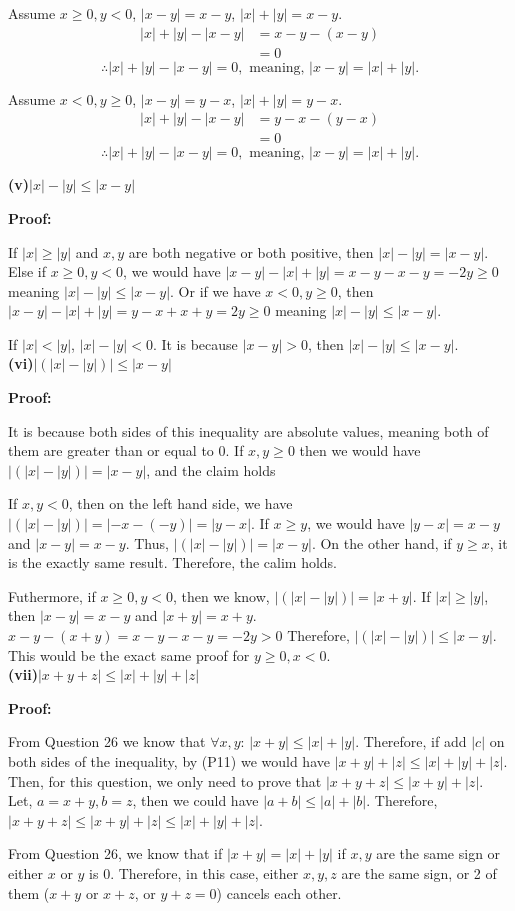 \documentclass[a4paper,12pt]{report}
\begin{document}
\noindent
Assume $x \geq 0, y < 0$, $|x-y|=x-y$, $|x|+|y| = x-y$.
\begin{align*}
 |x|+|y|-|x-y| & =x-y -(x-y) \\
 			   & =0
\end{align*}
\[\therefore |x|+|y|-|x-y|= 0, \text{ meaning, } |x-y|=|x|+|y|.\]

\noindent
Assume $x < 0, y \geq 0$, $|x-y|=y-x$, $|x|+|y| = y-x$.
\begin{align*}
 |x|+|y|-|x-y| & =y-x -(y-x) \\
 			   & =0
\end{align*}
\[\therefore |x|+|y|-|x-y|= 0, \text{ meaning, } |x-y|=|x|+|y|.\]

\noindent
\textbf{(v)}$ |x|-|y|\leq |x-y|$

\noindent
\textbf{Proof: }

\noindent
If $|x|\geq|y|$ and $x,y$ are both negative or both positive, then $ |x|-|y| = |x-y|$. Else if $x\geq 0, y <0$, we would have $|x-y|-|x|+|y|=x-y-x-y=-2y\geq 0$ meaning $ |x|-|y|\leq |x-y|$. Or if we have $x < 0, y \geq0$, then $|x-y|-|x|+|y|=y-x+x+y=2y\geq 0$ meaning $ |x|-|y|\leq |x-y|$.

\noindent
If $|x|<|y|$, $|x|-|y|<0$. It is because $|x-y|>0$, then $ |x|-|y|\leq |x-y|$. \\

\noindent
\textbf{(vi)}$ |(|x|-|y|)|\leq |x-y|$

\noindent
\textbf{Proof: }

\noindent
It is because both sides of this inequality are absolute values, meaning both of them are greater than or equal to 0. If $x,y \geq 0$ then we would have $|(|x|-|y|)|=|x-y|$, and the claim holds

\noindent
If $x,y <0$, then on the left hand side, we have $ |(|x|-|y|)|=|-x-(-y)|=|y-x|$. If $x\geq y$, we would have $|y-x|=x-y$ and $|x-y|=x-y$. Thus, $|(|x|-|y|)|=|x-y|$. On the other hand, if $y\geq x$, it is the exactly same result. Therefore, the calim holds. 

\noindent
Futhermore, if $x\geq 0, y<0$, then we know, $|(|x|-|y|)| = |x+y|$. If $|x|\geq|y|$, then $|x-y|=x-y$ and $|x+y|=x+y$. $x-y-(x+y)=x-y-x-y=-2y > 0$ Therefore, $ |(|x|-|y|)|\leq |x-y|$. This would be the exact same proof for $y\geq 0, x<0$.\\

\noindent
\textbf{(vii)}$ |x+y+z|\leq |x|+|y|+|z|$

\noindent
\textbf{Proof: }

\noindent
From Question 26 we know that $\forall x,y$: $|x+y|\leq|x|+|y|$. Therefore, if add $|c|$ on both sides of the inequality, by (P11) we would have $|x+y|+|z|\leq |x|+|y|+|z|$. Then, for this question, we only need to prove that $|x+y+z|\leq|x+y|+|z|$. Let, $a=x+y, b= z$, then we could have $|a+b|\leq|a|+|b|$. Therefore, $|x+y+z|\leq|x+y|+|z|\leq |x|+|y|+|z|$.

\noindent
From Question 26, we know that if $|x+y| = |x|+|y|$ if $x,y$ are the same sign or either $x$ or $y$ is 0. Therefore, in this case, either $x,y,z$ are the same sign, or 2 of them ($x+y$ or $x+z$, or $y+z =0$) cancels each other. 
\end{document}

